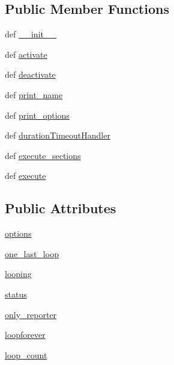 \subsection*{Public Member Functions}
\begin{DoxyCompactItemize}
\item 
def \hyperlink{classsequential_1_1SequentialEx_aef3e664b94447607395ba443ef126600}{\-\_\-\-\_\-init\-\_\-\-\_\-}
\item 
def \hyperlink{classsequential_1_1SequentialEx_a0395a18b172a964a208b5d39e5e6e9cd}{activate}
\item 
def \hyperlink{classsequential_1_1SequentialEx_ad0324c90b6af183853dc5453341bc166}{deactivate}
\item 
def \hyperlink{classsequential_1_1SequentialEx_ab82c1f57be3191cc5440df41a989cb90}{print\-\_\-name}
\item 
def \hyperlink{classsequential_1_1SequentialEx_a1d154cd0643f05739b7f62d14fa3be2f}{print\-\_\-options}
\item 
def \hyperlink{classsequential_1_1SequentialEx_aba3b7114b70e05ba8980e5fede23fab5}{duration\-Timeout\-Handler}
\item 
def \hyperlink{classsequential_1_1SequentialEx_aed2735c26fefda4e09918b02bcbcf20a}{execute\-\_\-sections}
\item 
def \hyperlink{classsequential_1_1SequentialEx_ad0371440bf0b65e8e59249d73d248cc7}{execute}
\end{DoxyCompactItemize}
\subsection*{Public Attributes}
\begin{DoxyCompactItemize}
\item 
\hyperlink{classsequential_1_1SequentialEx_a72ae94e2c46c2b1b8c5022eaf3593edf}{options}
\item 
\hyperlink{classsequential_1_1SequentialEx_a3dbe6e22b44436f3fef2c114550ad8ca}{one\-\_\-last\-\_\-loop}
\item 
\hyperlink{classsequential_1_1SequentialEx_a548a626b1a098a7ad2e0709fc97fa8f7}{looping}
\item 
\hyperlink{classsequential_1_1SequentialEx_a7f8ca8932ced5d9daf6191598894eb58}{status}
\item 
\hyperlink{classsequential_1_1SequentialEx_a7c81be8b211e0e01022948ce0a7d4e19}{only\-\_\-reporter}
\item 
\hyperlink{classsequential_1_1SequentialEx_a8cf719781ed7aa81bb27e30d4281cb66}{loopforever}
\item 
\hyperlink{classsequential_1_1SequentialEx_a4ba41b6f01a147966df8df335d570d22}{loop\-\_\-count}
\end{DoxyCompactItemize}


